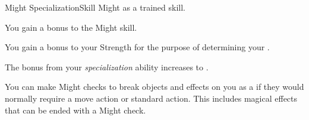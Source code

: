   \begin{feat}{Might Specialization}{Skill}
    \featpre Might as a trained skill.

     You gain a  bonus to the Might skill.

     You gain a  bonus to your Strength for the purpose of determining your .

     The bonus from your \textit{specialization} ability increases to .

     You can make Might checks to break objects and effects on you as a  if they would normally require a move action or standard action.
    This includes magical effects that can be ended with a Might check.
  \end{feat}

